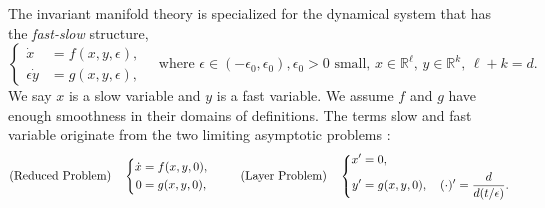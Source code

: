 \documentclass[usletter,11pt]{article}
\newcommand{\tcr}{\textcolor{red}}
\newcommand{\tcb}{\textcolor{blue}}
\theoremstyle{remark}
\begin{document}
% 
The invariant manifold theory is specialized for the dynamical system that has the {\it fast-slow} structure, 
\begin{equation} \label{eq:fast-slow}
 \left\{
 \begin{aligned}
  \dot{x}&=f(x,y,\epsilon),\\
  \epsilon\dot{y}&=g(x,y,\epsilon),
 \end{aligned}\right. \quad \text{where $\epsilon \in (-\epsilon_0,\epsilon_0), \epsilon_0>0$ small, $x\in \mathbb{R}^\ell$, $y\in \mathbb{R}^k$, $\ell+k=d$.}
\end{equation}
We say $x$ is a slow variable and $y$ is a fast variable. We assume $f$ and $g$ have enough smoothness in their domains of definitions. The terms slow and fast variable originate from
the two limiting asymptotic problems :
\begin{equation*} %
 \text{(Reduced Problem)}\quad\left\{
 \begin{aligned}
    \dot{x} &= f(x,y,0),\\
    0&= g(x,y,0),
 \end{aligned}\right. 
 \hspace{2.5em}
 \text{(Layer Problem)} \quad  
 \left\{
 \begin{aligned}
    x'&= 0,\\
    y'&= g(x,y,0), \quad (\cdot)' = \frac{d}{d(t/\epsilon)}.%
 \end{aligned}\right. 
\end{equation*}
\end{document}
